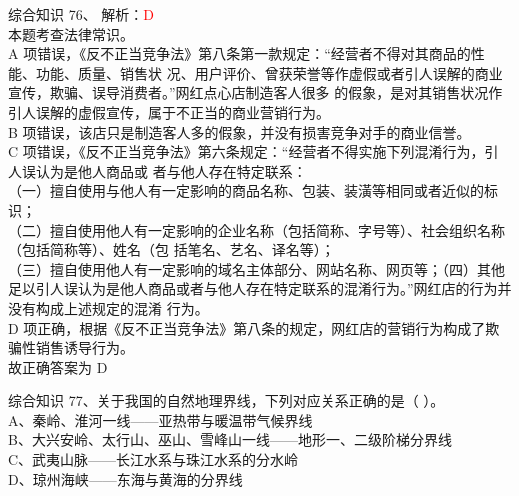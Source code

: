 \documentclass[aspectratio=169]{beamer}
\begin{document}
\begin{frame}[t]{综合知识}
    76、 解析：\textcolor{red}{D}\\
    本题考查法律常识。\\
    {\scriptsize
    A 项错误，《反不正当竞争法》第八条第一款规定：“经营者不得对其商品的性能、功能、质量、销售状
    况、用户评价、曾获荣誉等作虚假或者引人误解的商业宣传，欺骗、误导消费者。”网红点心店制造客人很多
    的假象，是对其销售状况作引人误解的虚假宣传，属于不正当的商业营销行为。\\
    B 项错误，该店只是制造客人多的假象，并没有损害竞争对手的商业信誉。\\
    C 项错误，《反不正当竞争法》第六条规定：“经营者不得实施下列混淆行为，引人误认为是他人商品或
    者与他人存在特定联系：\\
    （一）擅自使用与他人有一定影响的商品名称、包装、装潢等相同或者近似的标识；\\
    （二）擅自使用他人有一定影响的企业名称（包括简称、字号等）、社会组织名称（包括简称等）、姓名（包
    括笔名、艺名、译名等）；\\
    （三）擅自使用他人有一定影响的域名主体部分、网站名称、网页等；（四）其他
    足以引人误认为是他人商品或者与他人存在特定联系的混淆行为。”网红店的行为并没有构成上述规定的混淆
    行为。\\
    D 项正确，根据《反不正当竞争法》第八条的规定，网红店的营销行为构成了欺骗性销售诱导行为。\\
    故正确答案为 D \\
    }

\end{frame}                           





\begin{frame}[t]{综合知识}
    77、关于我国的自然地理界线，下列对应关系正确的是（ ）。          \\
    A、秦岭、淮河一线——亚热带与暖温带气候界线                        \\
    B、大兴安岭、太行山、巫山、雪峰山一线——地形一、二级阶梯分界线    \\
    C、武夷山脉——长江水系与珠江水系的分水岭                          \\
    D、琼州海峡——东海与黄海的分界线                                  \\
\end{frame}                           
\end{document}
